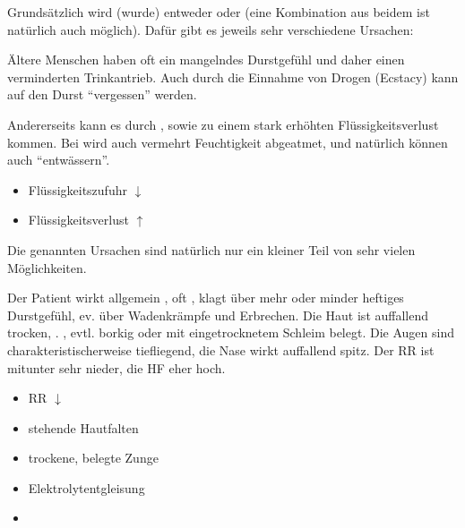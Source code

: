 

Grundsätzlich wird (wurde) entweder  oder  (eine Kombination aus beidem ist natürlich auch
möglich). Dafür gibt es jeweils sehr verschiedene Ursachen:

{%
Ältere Menschen haben oft ein mangelndes Durstgefühl und daher
einen verminderten Trinkantrieb. Auch durch die Einnahme von
Drogen (Ecstacy) kann auf den Durst \enquote{vergessen} werden.  

Andererseits kann es durch , 
sowie  zu einem stark erhöhten
Flüssigkeitsverlust kommen. Bei  wird auch
vermehrt Feuchtigkeit abgeatmet, und natürlich können
auch  \enquote{entwässern}.
}{
\begin{itemize} %
  \item Flüssigkeitszufuhr ${\downarrow}$
  \item Flüssigkeitsverlust ${\uparrow}$
\end{itemize}
}{}{}{}

Die genannten Ursachen sind natürlich nur ein kleiner Teil von sehr vielen
Möglichkeiten.

{%
Der Patient wirkt allgemein , oft
, klagt über mehr oder minder heftiges
Durstgefühl, ev. über Wadenkrämpfe und Erbrechen. Die Haut
ist auffallend trocken, . , evtl.
borkig oder mit eingetrocknetem Schleim belegt. Die Augen
sind charakteristischerweise tiefliegend, die Nase wirkt
auffallend spitz. Der RR ist mitunter sehr nieder, die HF
eher hoch. 
}{
\begin{itemize}
    \item RR ${\downarrow}$
    \item stehende Hautfalten
    \item trockene, belegte Zunge
    \item Elektrolytentgleisung
    \item {}
\end{itemize}
}{}{}{}


